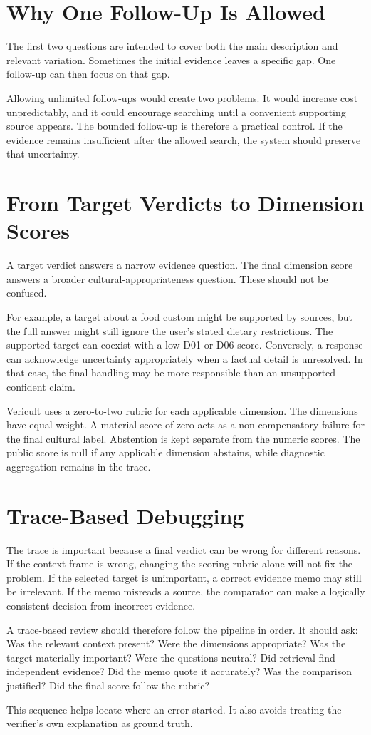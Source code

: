 \section{Why One Follow-Up Is Allowed}

The first two questions are intended to cover both the main description and relevant variation. Sometimes the initial evidence leaves a specific gap. One follow-up can then focus on that gap.

Allowing unlimited follow-ups would create two problems. It would increase cost unpredictably, and it could encourage searching until a convenient supporting source appears. The bounded follow-up is therefore a practical control. If the evidence remains insufficient after the allowed search, the system should preserve that uncertainty.

\section{From Target Verdicts to Dimension Scores}

A target verdict answers a narrow evidence question. The final dimension score answers a broader cultural-appropriateness question. These should not be confused.

For example, a target about a food custom might be supported by sources, but the full answer might still ignore the user's stated dietary restrictions. The supported target can coexist with a low D01 or D06 score. Conversely, a response can acknowledge uncertainty appropriately when a factual detail is unresolved. In that case, the final handling may be more responsible than an unsupported confident claim.

Vericult uses a zero-to-two rubric for each applicable dimension. The dimensions have equal weight. A material score of zero acts as a non-compensatory failure for the final cultural label. Abstention is kept separate from the numeric scores. The public score is null if any applicable dimension abstains, while diagnostic aggregation remains in the trace.

\section{Trace-Based Debugging}

The trace is important because a final verdict can be wrong for different reasons. If the context frame is wrong, changing the scoring rubric alone will not fix the problem. If the selected target is unimportant, a correct evidence memo may still be irrelevant. If the memo misreads a source, the comparator can make a logically consistent decision from incorrect evidence.

A trace-based review should therefore follow the pipeline in order. It should ask: Was the relevant context present? Were the dimensions appropriate? Was the target materially important? Were the questions neutral? Did retrieval find independent evidence? Did the memo quote it accurately? Was the comparison justified? Did the final score follow the rubric?

This sequence helps locate where an error started. It also avoids treating the verifier's own explanation as ground truth.
